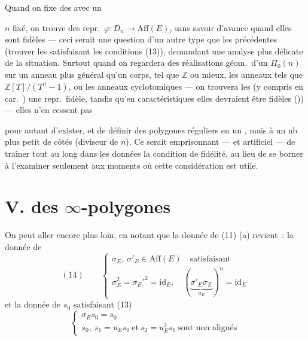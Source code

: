 \documentclass[11pt,a4paper]{article}
\begin{document}
Quand on fixe des  avec un

$n$ fixé, on trouve  des \struck{\ill{}} repr.\ $\varphi : D_n \to \mathrm{Aff}(E)$, sans savoir d'avance quand elles sont fidèles --- ceci serait une question d'un autre type que les précédentes \add{\ill{}} (trouver les  satisfaisant les conditions (13)), demandant une analyse plus \struck{\ill{}} délicate de la situation. Surtout quand on regardera des réalisations géom.\ d'un $\Pi_0(n)$ sur un anneau plus général qu'un corps, tel que $\mathbb{Z}$ ou mieux, les anneaux tels que $\mathbb{Z}[T]/(T^{n}-1)$, ou les anneaux cyclotomiques --- on trouvera  \struck{\ill{}} les \ill{} \ill{} \ill{} \ill{} (y compris en car.\ \ill{}) une repr.\ fidèle, tandis qu'en \ill{} caractéristiques elles devraient être fidèles ()) --- elles n'en cessent pas

pour autant d'exister, et de définir des polygones réguliers en un \ill{} \ill{}, mais à un nb plus petit de côtés (diviseur de $n$). Ce serait emprisonnant --- et  artificiel --- de traîner tout au long dans les données la condition de fidélité, au lieu de se borner à l'examiner seulement aux moments  où cette considération est utile.

\section{V. \ill{} des $\infty$-polygones}

On peut aller encore plus loin, en notant que la donnée de (11) (a) revient~: la donnée de
\[
  (14)\qquad
  \begin{cases}
    \sigma_E,\ \sigma'_E \in \mathrm{Aff}(E) \quad \text{satisfaisant} \\
    \sigma_E^{2} = \sigma_E'^{2} = \mathrm{id}_E ,
    \quad (\underbrace{\sigma'_E \sigma_E}_{u_E})^{n} = \mathrm{id}_E
  \end{cases}
\]
  et la donnée de $s_0$  satisfaisant  (13)
\[
  \begin{cases}
    \sigma_E s_0 = s_0 \\
    s_0,\ s_1 = u_E s_0 \ \text{et}\ s_2 = u_E^{2} s_0 \ \text{sont non alignés}
  \end{cases}
\]
\end{document}
